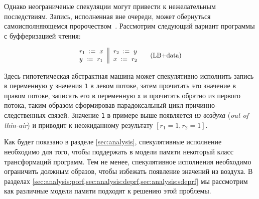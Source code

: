 Однако неограниченые спекуляции могут привести 
к нежелательным последствиям. 
Запись, исполненная вне очереди, может обернуться
самоисполняющемся пророчеством~\cite{Boehm-Demsky:MSPC14}. 
Рассмотрим следующий вариант программы с буфферизацией чтения:

\begin{equation*}
\small
\inarrII{
  \readInst{}{r_1}{x}   \\
  \writeInst{}{y}{r_1}  \\
}{
  \readInst{}{r_2}{y}   \\
  \writeInst{}{x}{r_2}  \\
}
\tag{LB+data}\label{ex:lb+data}
\end{equation*}

Здесь гипотетическая абстрактная машина 
может спекулятивно исполнить запись в переменную \texttt{y}
значения \texttt{1} в левом потоке, 
затем прочитать это значение в правом потоке, 
записать его в переменную \texttt{x} и прочитать обратно из 
первого потока, таким образом сформировав парадоксальный цикл 
причинно-следственных связей.  
Значение \texttt{1} в примере выше появляется \emph{из воздуха}
(\emph{out of thin-air}) и приводит 
к неожиданному результату ${[r_1=1, r_2=1]}$.

Как будет показано в разделе \cref{sec:analysis},
спекулятивные исполнение необходимо для того, чтобы 
поддержать в модели памяти некоторый класс трансформаций программ. 
Тем не менее, спекулятивное исполнения необходимо 
ограничить должным образов, чтобы избежать 
появление значений из воздуха. 
В разделах \cref{sec:analysis:porf,sec:analysis:deprf,sec:analysis:sdeprf}
мы рассмотрим как различные модели памяти подходят 
к решению этой проблемы. 
